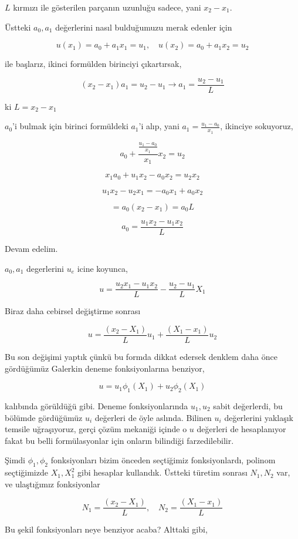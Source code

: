 \documentclass[12pt,fleqn]{article}\usepackage{../../common}
\begin{document}
$L$ kırmızı ile gösterilen parçanın uzunluğu sadece, yani $x_2 - x_1$.

Üstteki $a_0,a_1$ değerlerini nasıl bulduğumuzu merak edenler için

$$
u(x_1) = a_0 + a_1 x_1 = u_1, \quad
u(x_2) = a_0 + a_1 x_2 = u_2
$$

ile başlarız, ikinci formülden birinciyi çıkartırsak,

$$
(x_2 - x_1) a_1 = u_2 - u_1 \to a_1 = \frac{u_2 - u_1}{L}
$$

ki $L = x_2 - x_1$

$a_0$'i bulmak için birinci formüldeki $a_1$'i alıp, yani
$a_1 = \frac{u_1 - a_0}{x_1}$, ikinciye sokuyoruz,


$$
a_0 + \frac{\frac{u_1 - a_0}{x_1}}{x_1} x_2 = u_2
$$

$$
x_1 a_0 + u_1 x_2 - a_0 x_2 = u_2 x_2
$$

$$
u_1 x_2 - u_2x_1 = -a_0 x_1 + a_0 x_2
$$

$$
= a_0 (x_2 - x_1) = a_0 L
$$

$$
a_0 = \frac{u_1 x_2 - u_1 x_2}{L}
$$

Devam edelim.

$a_0,a_1$ degerlerini $u_e$ icine koyunca,

$$
u = \frac{u_2 x_1 - u_1 x_2}{L} - \frac{u_2 - u_1}{L} X_1
$$

Biraz daha cebirsel değiştirme sonrası

$$
u = \frac{(x_2 - X_1)}{L} u_1 + \frac{(X_1 - x_1)}{L} u_2
$$

Bu son değişimi yaptık çünkü bu formda dikkat edersek denklem daha önce
gördüğümüz Galerkin deneme fonksiyonlarına benziyor,

$$
u = u_1 \phi_1(X_1) + u_2 \phi_2 (X_1)
$$

kalıbında görüldüğü gibi. Deneme fonksiyonlarında $u_1,u_2$ sabit değerlerdi, bu
bölümde gördüğümüz $u_i$ değerleri de öyle aslında. Bilinen $u_i$ değerlerini
yaklaşık temsile uğraşıyoruz, gerçi çözüm mekaniği içinde o $u$ değerleri de
hesaplanıyor fakat bu belli formülasyonlar için onların bilindiği
farzedilebilir.

Şimdi $\phi_1,\phi_2$ fonksiyonları bizim önceden seçtiğimiz fonksiyonlardı,
polinom seçtiğimizde $X_1,X_1^2$ gibi hesaplar kullandık. Üstteki türetim
sonrası $N_1,N_2$ var, ve ulaştığımız fonksiyonlar

$$
N_1 = \frac{(x_2 - X_1)}{L}, \quad N_2 = \frac{(X_1 - x_1)}{L} 
$$

Bu şekil fonksiyonları neye benziyor acaba? Alttaki gibi,
\end{document}
